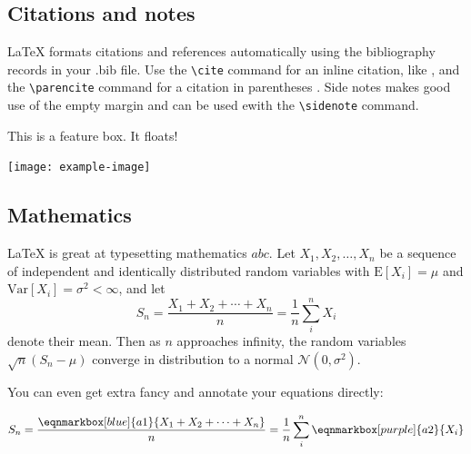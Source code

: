 \begin{figure}
\begin{fullwidth}
    \end{fullwidth}
\end{figure}

\subsection{Citations and notes}

LaTeX formats citations and references automatically using the bibliography records in your .bib file. Use the \verb|\cite| command for an inline citation, like \cite{Pooley2021}, and the \verb|\parencite| command for a citation in parentheses \parencite{Brembs2021}. Side notes makes good use of the empty margin and can be used ewith the \verb|\sidenote| command. 



\begin{featurebox}
\caption{This is an example feature box}
\label{box:simple}
This is a feature box. It floats!
\medskip

\texttt{[image: example-image]}

\lipsum[1]
\end{featurebox}

\subsection{Mathematics}

\LaTeX{} is great at typesetting mathematics $abc$. Let $X_1, X_2, \ldots, X_n$ be a sequence of independent and identically distributed random variables with $\text{E}[X_i] = \mu$ and $\text{Var}[X_i] = \sigma^2 < \infty$, and let
\begin{equation}
\label{eq:CLT}
S_n = \frac{X_1 + X_2 + \cdots + X_n}{n}
      = \frac{1}{n}\sum_{i}^{n} X_i
\end{equation}
denote their mean. Then as $n$ approaches infinity, the random variables $\sqrt{n}(S_n - \mu)$ converge in distribution to a normal $\mathcal{N}(0, \sigma^2)$.

You can even get extra fancy and annotate your equations directly: %

\vspace{1.5em} 
\begin{equation}
\label{eq:CLT2}
S_n = \frac{\eqnmarkbox[blue]{a1}{X_1 + X_2 + \cdots + X_n}}{n}
      = \frac{1}{n}\sum_{i}^{n} \eqnmarkbox[purple]{a2}{X_i}
\end{equation}
\vspace{1.5em} 

